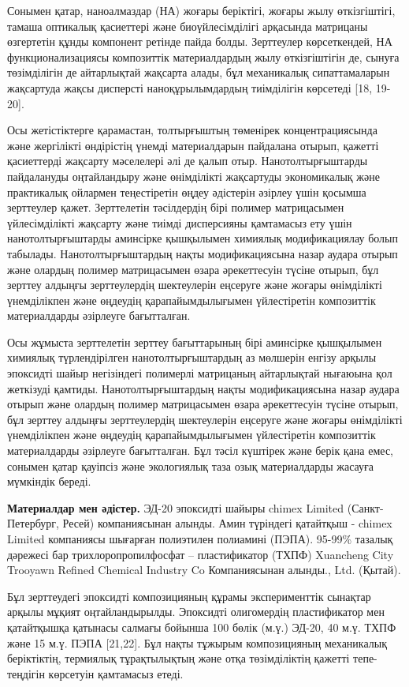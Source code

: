 Сонымен қатар, наноалмаздар (НА) жоғары беріктігі, жоғары жылу
өткізгіштігі, тамаша оптикалық қасиеттері және биоүйлесімділігі
арқасында матрицаны өзгертетін құнды компонент ретінде пайда болды.
Зерттеулер көрсеткендей, НА функционализациясы композиттік
материалдардың жылу өткізгіштігін де, сынуға төзімділігін де айтарлықтай
жақсарта алады, бұл механикалық сипаттамаларын жақсартуда жақсы
дисперсті наноқұрылымдардың тиімділігін көрсетеді {[}18, 19-20{]}.

Осы жетістіктерге қарамастан, толтырғыштың төменірек концентрациясында
және жергілікті өндірістің үнемді материалдарын пайдалана отырып,
қажетті қасиеттерді жақсарту мәселелері әлі де қалып отыр.
Нанотолтырғыштарды пайдалануды оңтайландыру және өнімділікті жақсартуды
экономикалық және практикалық ойлармен теңестіретін өңдеу әдістерін
әзірлеу үшін қосымша зерттеулер қажет. Зерттелетін тәсілдердің бірі
полимер матрицасымен үйлесімділікті жақсарту және тиімді дисперсияны
қамтамасыз ету үшін нанотолтырғыштарды аминсірке қышқылымен химиялық
модификациялау болып табылады. Нанотолтырғыштардың нақты модификациясына
назар аудара отырып және олардың полимер матрицасымен өзара әрекеттесуін
түсіне отырып, бұл зерттеу алдыңғы зерттеулердің шектеулерін еңсеруге
және жоғары өнімділікті үнемділікпен және өңдеудің қарапайымдылығымен
үйлестіретін композиттік материалдарды әзірлеуге бағытталған.

Осы жұмыста зерттелетін зерттеу бағыттарының бірі аминсірке қышқылымен
химиялық түрлендірілген нанотолтырғыштардың аз мөлшерін енгізу арқылы
эпоксидті шайыр негізіндегі полимерлі матрицаның айтарлықтай нығаюына
қол жеткізуді қамтиды. Нанотолтырғыштардың нақты модификациясына назар
аудара отырып және олардың полимер матрицасымен өзара әрекеттесуін
түсіне отырып, бұл зерттеу алдыңғы зерттеулердің шектеулерін еңсеруге
және жоғары өнімділікті үнемділікпен және өңдеудің қарапайымдылығымен
үйлестіретін композиттік материалдарды әзірлеуге бағытталған. Бұл тәсіл
күштірек және берік қана емес, сонымен қатар қауіпсіз және экологиялық
таза озық материалдарды жасауға мүмкіндік береді.

{\bfseries Материалдар мен әдістер.} ЭД-20 эпоксидті шайыры chimex Limited
(Санкт-Петербург, Ресей) компаниясынан алынды. Амин түріндегі қатайтқыш
- chimex Limited компаниясы шығарған полиэтилен полиамині (ПЭПА).
95-99\% тазалық дәрежесі бар трихлоропропилфосфат -- пластификатор
(ТХПФ) Xuancheng City Trooyawn Refined Chemical Industry Co
Компаниясынан алынды., Ltd. (Қытай).

Бұл зерттеудегі эпоксидті композицияның құрамы эксперименттік сынақтар
арқылы мұқият оңтайландырылды. Эпоксидті олигомердің пластификатор мен
қатайтқышқа қатынасы салмағы бойынша 100 бөлік (м.ү.) ЭД-20, 40 м.ү.
ТХПФ және 15 м.ү. ПЭПА {[}21,22{]}. Бұл нақты тұжырым композицияның
механикалық беріктіктің, термиялық тұрақтылықтың және отқа төзімділіктің
қажетті тепе-теңдігін көрсетуін қамтамасыз етеді.


